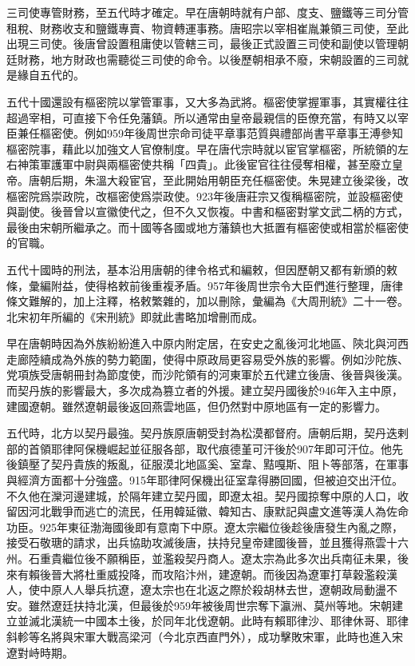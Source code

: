 三司使專管財務，至五代時才確定。早在唐朝時就有户部、度支、鹽鐵等三司分管租稅、財務收支和鹽鐵專賣、物資轉運事務。唐昭宗以宰相崔胤兼領三司使，至此出現三司使。後唐曾設置租庸使以管轄三司，最後正式設置三司使和副使以管理朝廷財務，地方財政也需聽從三司使的命令。以後歷朝相承不廢，宋朝設置的三司就是緣自五代的。

五代十國還設有樞密院以掌管軍事，又大多為武將。樞密使掌握軍事，其實權往往超過宰相，可直接下令任免藩鎮。所以通常由皇帝最親信的臣僚充當，有時又以宰臣兼任樞密使。例如959年後周世宗命司徒平章事范質與禮部尚書平章事王溥參知樞密院事，藉此以加強文人官僚制度。早在唐代宗時就以宦官掌樞密，所統領的左右神策軍護軍中尉與兩樞密使共稱「四貴」。此後宦官往往侵奪相權，甚至廢立皇帝。唐朝后期，朱溫大殺宦官，至此開始用朝臣充任樞密使。朱晃建立後梁後，改樞密院爲崇政院，改樞密使爲崇政使。923年後唐莊宗又復稱樞密院，並設樞密使與副使。後晉曾以宣徽使代之，但不久又恢複。中書和樞密對掌文武二柄的方式，最後由宋朝所繼承之。而十國等各國或地方藩鎮也大抵置有樞密使或相當於樞密使的官職。

五代十國時的刑法，基本沿用唐朝的律令格式和編敕，但因歷朝又都有新頒的敕條，彙編附益，使得格敕前後重複矛盾。957年後周世宗令大臣們進行整理，唐律條文難解的，加上注釋，格敕繁雜的，加以刪除，彙編為《大周刑統》二十一卷。北宋初年所編的《宋刑統》即就此書略加增刪而成。

早在唐朝時因為外族紛紛進入中原内附定居，在安史之亂後河北地區、陝北與河西走廊陸續成為外族的勢力範圍，使得中原政局更容易受外族的影響。例如沙陀族、党項族受唐朝冊封為節度使，而沙陀領有的河東軍於五代建立後唐、後晉與後漢。而契丹族的影響最大，多次成為篡立者的外援。建立契丹國後於946年入主中原，建國遼朝。雖然遼朝最後返回燕雲地區，但仍然對中原地區有一定的影響力。

五代時，北方以契丹最強。契丹族原唐朝受封為松漠都督府。唐朝后期，契丹迭剌部的首領耶律阿保機崛起並征服各部，取代痕德堇可汗後於907年即可汗位。他先後鎮壓了契丹貴族的叛亂，征服漠北地區奚、室韋、黠嘎斯、阻卜等部落，在軍事與經濟方面都十分強盛。915年耶律阿保機出征室韋得勝回國，但被迫交出汗位。不久他在灤河邊建城，於隔年建立契丹國，即遼太祖。契丹國掠奪中原的人口，收留因河北戰爭而逃亡的流民，任用韓延徽、韓知古、康默記與盧文進等漢人為佐命功臣。925年東征渤海國後即有意南下中原。遼太宗繼位後趁後唐發生內亂之際，接受石敬瑭的請求，出兵協助攻滅後唐，扶持兒皇帝建國後晉，並且獲得燕雲十六州。石重貴繼位後不願稱臣，並濫殺契丹商人。遼太宗為此多次出兵南征未果，後來有賴後晉大將杜重威投降，而攻陷汴州，建遼朝。而後因為遼軍打草穀濫殺漢人，使中原人人舉兵抗遼，遼太宗也在北返之際於殺胡林去世，遼朝政局動盪不安。雖然遼廷扶持北漢，但最後於959年被後周世宗奪下瀛洲、莫州等地。宋朝建立並滅北漢統一中國本土後，於同年北伐遼朝。此時有賴耶律沙、耶律休哥、耶律斜軫等名將與宋軍大戰高梁河（今北京西直門外），成功擊敗宋軍，此時也進入宋遼對峙時期。

